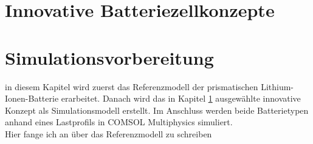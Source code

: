 \section{Innovative Batteriezellkonzepte}\label{sec:innovativeBattery}

\newpage
\section{Simulationsvorbereitung}\label{sec:SimulationPREP}

in diesem Kapitel wird zuerst das Referenzmodell der prismatischen Lithium-Ionen-Batterie erarbeitet. Danach wird das in Kapitel \ref{sec:innovativeBattery} ausgewählte innovative Konzept als Simulationsmodell erstellt. Im Anschluss werden beide Batterietypen anhand eines Lastprofils in COMSOL Multiphysics simuliert.\\



Hier fange ich an über das Referenzmodell zu schreiben


	